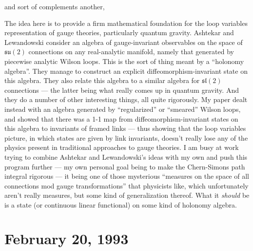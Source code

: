 \documentclass{article}
\def\tightlist{}
\renewcommand{\texttt}[1]{%
  \begingroup
  \ttfamily
  \begingroup\lccode`~=`/\lowercase{\endgroup\def~}{/\discretionary{}{}{}}%
  \begingroup\lccode`~=`[\lowercase{\endgroup\def~}{[\discretionary{}{}{}}%
  \begingroup\lccode`~=`.\lowercase{\endgroup\def~}{.\discretionary{}{}{}}%
  \catcode`/=\active\catcode`[=\active\catcode`.=\active
  \scantokens{#1\noexpand}%
  \endgroup
}
\begin{document}
and sort of complements another,


The idea here is to provide a firm mathematical foundation for the loop
variables representation of gauge theories, particularly quantum
gravity. Ashtekar and Lewandowski consider an algebra of gauge-invariant
observables on the space of \(\mathfrak{su}(2)\) connections on any
real-analytic manifold, namely that generated by piecewise analytic
Wilson loops. This is the sort of thing meant by a ``holonomy algebra''.
They manage to construct an explicit diffeomorphism-invariant state on
this algebra. They also relate this algebra to a similar algebra for
\(\mathfrak{sl}(2)\) connections --- the latter being what really comes
up in quantum gravity. And they do a number of other interesting things,
all quite rigorously. My paper dealt instead with an algebra generated
by ``regularized'' or ``smeared'' Wilson loops, and showed that there
was a 1-1 map from diffeomorphism-invariant states on this algebra to
invariants of framed links --- thus showing that the loop variables
picture, in which states are given by link invariants, doesn't really
lose any of the physics present in traditional approaches to gauge
theories. I am busy at work trying to combine Ashtekar and Lewandowski's
ideas with my own and push this program further --- my own personal goal
being to make the Chern-Simons path integral rigorous --- it being one
of those mysterious ``measures on the space of all connections mod gauge
transformations'' that physicists like, which unfortunately aren't
really measures, but some kind of generalization thereof. What it
\emph{should} be is a state (or continuous linear functional) on some
kind of holonomy algebra.
\hypertarget{week6}{%
\section{February 20, 1993}\label{week6}}

\end{document}
